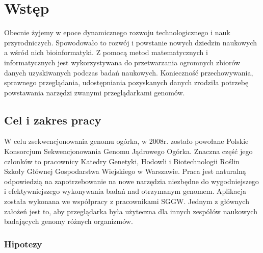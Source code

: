 
\chapter{Wstęp}
\label{section:wstep}

Obecnie żyjemy w epoce dynamicznego rozwoju technologicznego i nauk przyrodniczych. Spowodowało to rozwój i powstanie nowych dziedzin naukowych a wśród nich bioinformatyki. Z pomocą metod matematycznych i informatycznych jest wykorzystywana do przetwarzania ogromnych zbiorów danych uzyskiwanych podczas badań naukowych. Konieczność przechowywania, sprawnego przeglądania, udostępniania pozyskanych danych zrodziła potrzebę powstawania narzędzi zwanymi przeglądarkami genomów.

\section{Cel i zakres pracy}
\label{section:cel_i_zakres_pracy}
W celu zsekwencjonowania genomu ogórka, w 2008r. zostało powołane Polskie Konsorcjum Sekwencjonowania Genomu Jądrowego Ogórka. Znaczna część jego członków to pracownicy Katedry Genetyki, Hodowli i Biotechnologii Roślin Szkoły Głównej Gospodarstwa Wiejskiego w Warszawie. Praca jest naturalną odpowiedzią na zapotrzebowanie na nowe narzędzia niezbędne do wygodniejszego i efektywniejszego  wykonywania badań nad otrzymanym genomem. Aplikacja została wykonana we współpracy z pracownikami SGGW. Jednym z głównych założeń jest to, aby przeglądarka była użyteczna dla innych zespółów naukowych badających genomy różnych organizmów.

\subsection{Hipotezy}

